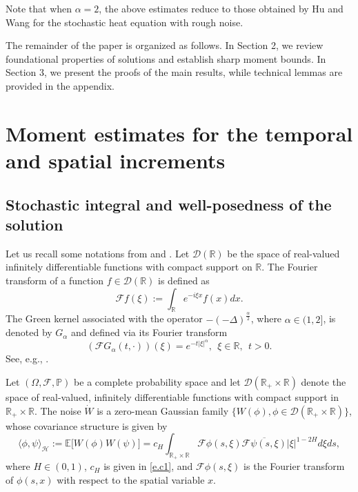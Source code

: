 \documentclass[11pt,reqno]{amsart}
\numberwithin{equation}{section}
\def\RR{\mathbb{R}}
\def\EE{\mathbb{E}}
\def\cF{\mathcal{F}}
\def\cD{\mathcal{D}}
\newcommand{\1}{{\bf 1}}
\newcommand{\2}{{\bf 2}}
\begin{document}
Note that when  $\alpha=2$,  the above estimates reduce to those obtained by Hu and Wang \cite{HW2022} for the stochastic heat equation with rough noise.


The remainder of the paper is organized as follows.   In Section 2, we  review  foundational properties of solutions and establish  sharp moment bounds. In Section 3, we  present the proofs of the main results, while technical lemmas are provided in the appendix.


\section{Moment estimates for the temporal and spatial increments}

\subsection{Stochastic integral and well-posedness of the solution}
Let us  recall some notations from \cite{HHLNT2017} and  \cite{HW2022}.   Let  $\cD(\RR)$  be the space of real-valued infinitely differentiable  functions with compact support on $\mathbb{R}$.      The Fourier transform of  a function $f\in\cD(\RR)$ is defined as
     $$
      \cF f(\xi):=\int_{\RR} e^{-i\xi x}f(x) dx.
    $$
   The Green kernel associated with the operator
$-(-\Delta)^{\frac{\alpha}{2}}$, where $\alpha\in (1,2]$, is denoted by  $G_{\alpha}$ and   defined via its Fourier transform 
    \begin{equation}\label{F-Green kernel}
    (\cF G_{\alpha}(t,\cdot))(\xi)=e^{-t|\xi|^{\alpha}}, \ \ \xi\in{\RR},\ \ t> 0.
    \end{equation}
See, e.g.,  \cite{ANTV22, CD15, CHN21}.

     Let $(\Omega,\cF,\mathbb P)$ be a complete probability space and  let $\mathcal{D}(\mathbb{R}_{+}\times \mathbb{R})$  denote  the space of real-valued, infinitely differentiable functions with compact support  in $\mathbb{R}_{+}\times \mathbb{R}$. The noise $\dot W$ is a zero-mean Gaussian family $\{W(\phi), \phi\in\cD(\RR_{+}\times \RR)\}$,  whose covariance structure is given by
     \begin{equation}\label{eq H product}
    \langle\phi,\psi\rangle_{\mathcal H}:= \EE\big[ W(\phi)W(\psi)\big]=c_{H}\int_{\RR_{+}\times \RR} \cF \phi(s,\xi) \overline{\cF \psi(s,\xi)}  |\xi|^{1-2H}d\xi ds,
     \end{equation}
     where $H\in\left(0, 1\right)$, $c_{H}$ is given in \eqref{e.c1},
     and $\cF \phi(s,\xi)$ is the Fourier transform of $\phi(s,x)$ with respect to the spatial variable $x$.
     
\end{document}
